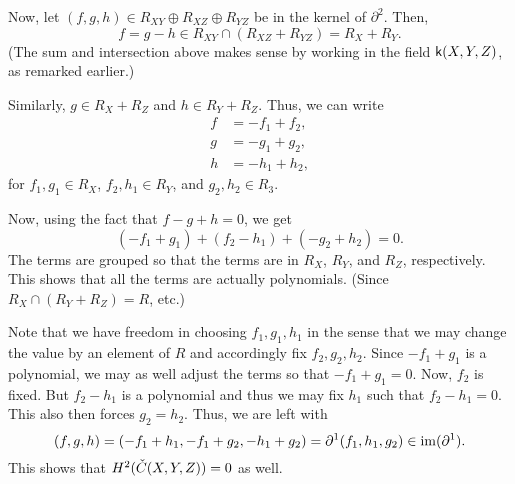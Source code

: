 \begin{ex}
	Now, let $(f, g, h) \in R_{XY} \oplus R_{XZ} \oplus R_{YZ}$ be in the kernel of $\partial^{2}$. Then,
	\begin{equation*} 
		f = g - h \in R_{XY} \cap (R_{XZ} + R_{YZ}) = R_{X} + R_{Y}.
	\end{equation*}
	(The sum and intersection above makes sense by working in the field $\mathsf{k}(X, Y, Z)$, as remarked earlier.)

	Similarly, $g \in R_{X} + R_{Z}$ and $h \in R_{Y} + R_{Z}$. Thus, we can write
	\begin{align*} 
		f &= -f_{1} + f_{2}, \\
		g &= -g_{1} + g_{2}, \\
		h &= -h_{1} + h_{2},
	\end{align*}
	for $f_{1}, g_{1} \in R_{X}$, $f_{2}, h_{1} \in R_{Y}$, and $g_{2}, h_{2} \in R_{3}$.

	Now, using the fact that $f - g + h = 0$, we get
	\begin{equation*} 
		(-f_{1} + g_{1}) + (f_{2} - h_{1}) + (-g_{2} + h_{2}) = 0.
	\end{equation*}
	The terms are grouped so that the terms are in $R_{X}$, $R_{Y}$, and $R_{Z}$, respectively. This shows that all the terms are actually polynomials. (Since $R_{X} \cap (R_{Y} + R_{Z}) = R$, etc.) 

	Note that we have freedom in choosing $f_{1}, g_{1}, h_{1}$ in the sense that we may change the value by an element of $R$ and accordingly fix $f_{2}, g_{2}, h_{2}$. Since $-f_{1} + g_{1}$ is a polynomial, we may as well adjust the terms so that $-f_{1} + g_{1} = 0$. Now, $f_{2}$ is fixed. But $f_{2} - h_{1}$ is a polynomial and thus we may fix $h_{1}$ such that $f_{2} - h_{1} = 0$. This also then forces $g_{2} = h_{2}$. Thus, we are left with
	\begin{equation*} 
		(f, g, h) = (-f_{1} + h_{1}, -f_{1} + g_{2}, -h_{1} + g_{2}) = \partial^{1}(f_{1}, h_{1}, g_{2}) \in \operatorname{im}(\partial^{1}).
	\end{equation*}
	This shows that $H^{2}(\check{C}(X, Y, Z)) = 0$ as well.
\end{ex}

